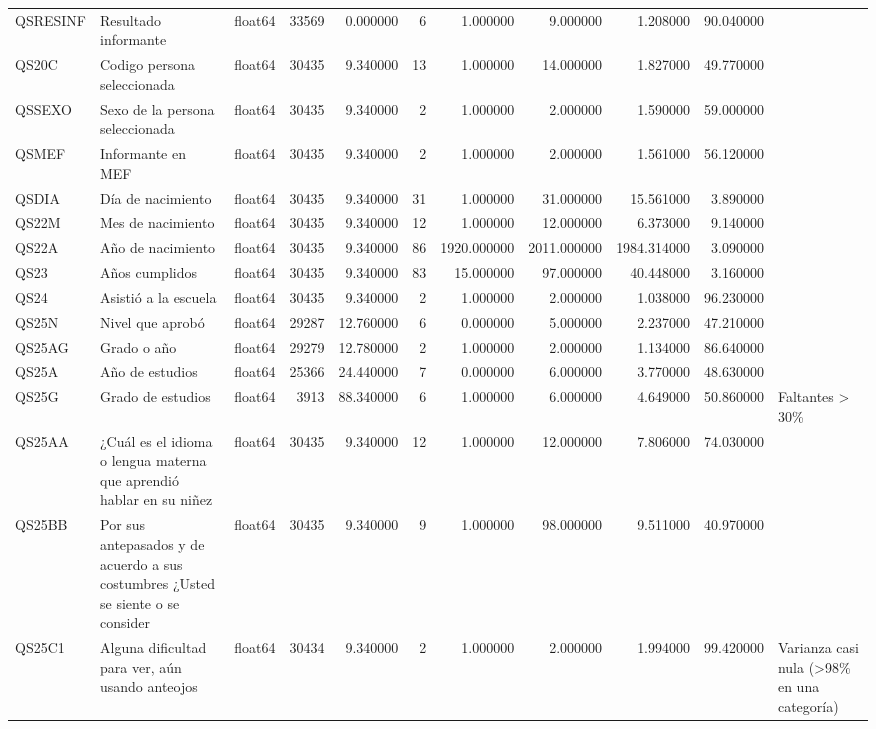 \begin{longtable}{lllrrrrrrrl}
QSRESINF & Resultado informante & float64 & 33569 & 0.000000 & 6 & 1.000000 & 9.000000 & 1.208000 & 90.040000 &  \\
QS20C & Codigo persona seleccionada & float64 & 30435 & 9.340000 & 13 & 1.000000 & 14.000000 & 1.827000 & 49.770000 &  \\
QSSEXO & Sexo de la persona seleccionada & float64 & 30435 & 9.340000 & 2 & 1.000000 & 2.000000 & 1.590000 & 59.000000 &  \\
QSMEF & Informante en MEF & float64 & 30435 & 9.340000 & 2 & 1.000000 & 2.000000 & 1.561000 & 56.120000 &  \\
QSDIA & Día de nacimiento & float64 & 30435 & 9.340000 & 31 & 1.000000 & 31.000000 & 15.561000 & 3.890000 &  \\
QS22M & Mes de nacimiento & float64 & 30435 & 9.340000 & 12 & 1.000000 & 12.000000 & 6.373000 & 9.140000 &  \\
QS22A & Año de nacimiento & float64 & 30435 & 9.340000 & 86 & 1920.000000 & 2011.000000 & 1984.314000 & 3.090000 &  \\
QS23 & Años cumplidos & float64 & 30435 & 9.340000 & 83 & 15.000000 & 97.000000 & 40.448000 & 3.160000 &  \\
QS24 & Asistió a la escuela & float64 & 30435 & 9.340000 & 2 & 1.000000 & 2.000000 & 1.038000 & 96.230000 &  \\
QS25N & Nivel que aprobó & float64 & 29287 & 12.760000 & 6 & 0.000000 & 5.000000 & 2.237000 & 47.210000 &  \\
QS25AG & Grado o año & float64 & 29279 & 12.780000 & 2 & 1.000000 & 2.000000 & 1.134000 & 86.640000 &  \\
QS25A & Año de estudios & float64 & 25366 & 24.440000 & 7 & 0.000000 & 6.000000 & 3.770000 & 48.630000 &  \\
QS25G & Grado de estudios & float64 & 3913 & 88.340000 & 6 & 1.000000 & 6.000000 & 4.649000 & 50.860000 & Faltantes > 30\% \\
QS25AA & ¿Cuál es el idioma o lengua materna que aprendió hablar en su niñez & float64 & 30435 & 9.340000 & 12 & 1.000000 & 12.000000 & 7.806000 & 74.030000 &  \\
QS25BB & Por sus antepasados y de acuerdo a sus costumbres ¿Usted se siente o se consider & float64 & 30435 & 9.340000 & 9 & 1.000000 & 98.000000 & 9.511000 & 40.970000 &  \\
QS25C1 & Alguna dificultad para ver, aún usando anteojos & float64 & 30434 & 9.340000 & 2 & 1.000000 & 2.000000 & 1.994000 & 99.420000 & Varianza casi nula (>98\% en una categoría) \\

\end{longtable}
